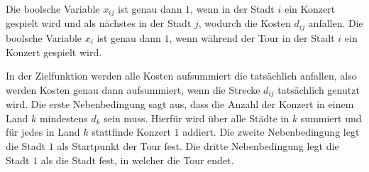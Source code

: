 \documentclass[10pt]{article}
\begin{document}
      Die boolsche Variable $x_{ij}$ ist genau dann $1$, wenn in der Stadt $i$
      ein Konzert gespielt wird und als nächstes in der Stadt $j$, wodurch die
      Kosten $d_{ij}$ anfallen.
      Die boolsche Variable $x_{i}$ ist genau dann $1$, wenn während der Tour
      in der Stadt $i$ ein Konzert gespielt wird.

      In der Zielfunktion werden alle Kosten aufsummiert die tatsächlich
      anfallen, also werden Kosten genau dann aufsummiert, wenn die Strecke
      $d_{ij}$ tatsächlich genutzt wird.
      Die erste Nebenbedingung sagt aus, dass die Anzahl der Konzert in einem
      Land $k$ mindestens $d_{k}$ sein muss. Hierfür wird über alle Städte in
      $k$ summiert und für jedes in Land $k$ stattfinde Konzert $1$ addiert.
      Die zweite Nebenbedingung legt die Stadt $1$ als Startpunkt der Tour fest.
      Die dritte Nebenbedingung legt die Stadt $1$ als die Stadt fest, in
      welcher die Tour endet.
\end{document}

